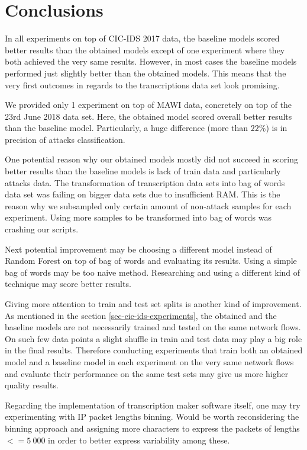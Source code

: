 \documentclass{article}
\begin{document}
\clearpage
\section{Conclusions}
In all experiments on top of CIC-IDS 2017 data, the baseline models scored better results than the obtained models except of one experiment where they both achieved the very same results. However, in most cases the baseline models performed just slightly better than the obtained models. This means that the very first outcomes in regards to the transcriptions data set look promising.

We provided only 1 experiment on top of MAWI data, concretely on top of the 23rd June 2018 data set. Here, the obtained model scored overall better results than the baseline model. Particularly, a huge difference (more than $22\%$) is in precision of attacks classification.

One potential reason why our obtained models mostly did not succeed in scoring better results than the baseline models is lack of train data and particularly attacks data. The transformation of transcription data sets into bag of words data set was failing on bigger data sets due to insufficient RAM. This is the reason why we subsampled only certain amount of non-attack samples for each experiment. Using more samples to be transformed into bag of words was crashing our scripts.

Next potential improvement may be choosing a different model instead of Random Forest on top of bag of words and evaluating its results. Using a simple bag of words may be too naive method. Researching and using a different kind of technique may score better results.

Giving more attention to train and test set splits is another kind of improvement. As mentioned in the section \ref{sec-cic-ids-experiments}, the obtained and the baseline models are not necessarily trained and tested on the same network flows. On such few data points a slight shuffle in train and test data may play a big role in the final results. Therefore conducting experiments that train both an obtained model and a baseline model in each experiment on the very same network flows and evaluate their performance on the same test sets may give us more higher quality results.

Regarding the implementation of transcription maker software itself, one may try experimenting with IP packet lengths binning. Would be worth reconsidering the binning approach and assigning more characters to express the packets of lengths $<= 5\ 000$ in order to better express variability among these.
\end{document}
